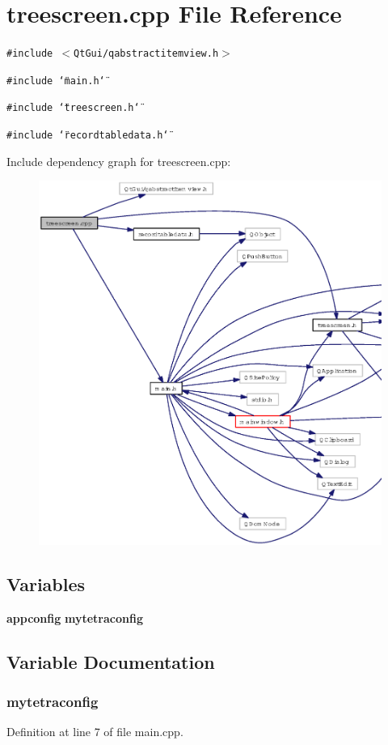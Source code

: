 \section{treescreen.cpp File Reference}
\label{treescreen_8cpp}
{\tt \#include $<$Qt\-Gui/qabstractitemview.h$>$}\par
{\tt \#include \char`\"{}main.h\char`\"{}}\par
{\tt \#include \char`\"{}treescreen.h\char`\"{}}\par
{\tt \#include \char`\"{}recordtabledata.h\char`\"{}}\par


Include dependency graph for treescreen.cpp:\begin{figure}[H]
\begin{center}
\leavevmode
\includegraphics[width=345pt]{treescreen_8cpp__incl}
\end{center}
\end{figure}
\subsection*{Variables}
\begin{CompactItemize}
\item 
{\bf appconfig} {\bf mytetraconfig}
\end{CompactItemize}


\subsection{Variable Documentation}
\subsubsection{ {\bf mytetraconfig}}\label{treescreen_8cpp_69bd0a7d678d494effdef51808501712}




Definition at line 7 of file main.cpp.